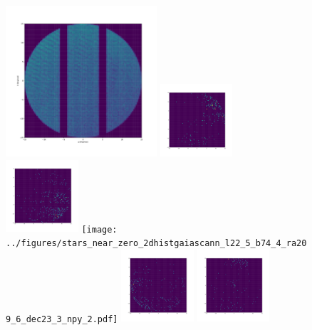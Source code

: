 \documentclass[12pt,prd]{article}
\begin{document}
\begin{figure}[h!]
\centering
\includegraphics[width=0.5\textwidth]{../figures/histogram2dgaiascan_l22_5_b74_4_ra209_6_dec23_3_npy.pdf}
\includegraphics[width=0.24\textwidth]{../figures/stars_near_zero_2dhistgaiascan_l22_5_b74_4_ra209_6_dec23_3_npy_0.pdf}
\includegraphics[width=0.24\textwidth]{../figures/stars_near_zero_2dhistgaiascan_l22_5_b74_4_ra209_6_dec23_3_npy_1.pdf}
\texttt{[image: ../figures/stars\_near\_zero\_2dhistgaiascann\_l22\_5\_b74\_4\_ra209\_6\_dec23\_3\_npy\_2.pdf]}
\includegraphics[width=0.24\textwidth]{../figures/stars_near_zero_2dhistgaiascan_l22_5_b74_4_ra209_6_dec23_3_npy_3.pdf}
\includegraphics[width=0.24\textwidth]{../figures/stars_near_zero_2dhistgaiascan_l22_5_b74_4_ra209_6_dec23_3_npy_4.pdf}

\end{figure}
\end{document}
